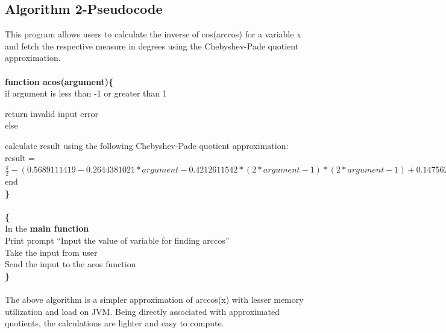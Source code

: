 \documentclass[12pt]{report}
\begin{document}
	\subsection{Algorithm 2-Pseudocode}	
	This program allows users to calculate the inverse of cos(arccos) for a variable x and fetch the respective measure in degrees using the Chebyshev-Pade quotient approximation.\\\\
	\textbf{function acos(argument)\{}\\
		if argument is less than -1 or greater than 1\par
		\vspace{-0.3cm}return invalid input error\\
		else\par
		\vspace{-0.3cm}calculate result using the following Chebyshev-Pade quotient approximation:\\
		result = $\frac{\pi}{2}-(0.5689111419 - 0.2644381021*argument-0.4212611542*(2*argument - 1)*(2*argument - 1)+0.1475622352*(2*argument - 1)*(2*argument - 1)*(2*argument - 1))/(2.006022274 - 2.343685222*argument + 0.3316406750*(2*argument - 1)*(2*argument - 1)+0.02607135626*(2*x - 1)*(2*x - 1)*(2*x - 1))$\\
		\vspace{0cm}
		end\\
	\textbf{\}}\\\\
	\textbf{\{}\\
	In the \textbf{main function}\\
	Print prompt “Input the value of variable for finding arccos”\\
	Take the input from user\\
	Send the input to the acos function\\
	\textbf{\}}\\\\
	The above algorithm is a simpler approximation of arccos(x) with lesser memory utilization and load on JVM. Being directly associated with approximated quotients, the calculations are lighter and easy to compute.
	
\end{document}
